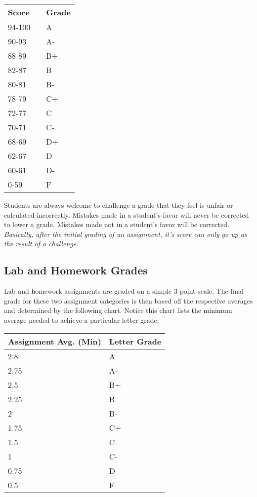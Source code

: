 \documentclass[10pt]{article}
\begin{document}
\begin{center}
\begin{small}
\begin{tabular}{lcl}
Score & & Grade \\ \hline
94-100 & & A \\
90-93 & & A- \\
88-89 & & B+ \\
82-87 & & B \\
80-81 & & B- \\
78-79 & & C+ \\
72-77 & & C \\
70-71 & & C- \\
68-69 & & D+ \\
62-67 & & D \\
60-61 & & D- \\
0-59 & & F 
\end{tabular}
\end{small}
\end{center}

Students are always welcome to challenge a grade that they feel is unfair or calculated incorrectly.  Mistakes made in a student's favor will never be corrected to lower a grade.  Mistakes made not in a student's favor will be corrected.  \textit{Basically, after the initial grading of an assignment, it's score can only go up as the result of a challenge.}

\subsection{Lab and Homework Grades}

Lab and homework assignments are graded on a simple 3 point scale.  The final grade for these two assignment categories is then based off the respective averages and determined by the following chart.  Notice this chart lists the minimum average needed to achieve a particular letter grade.  

\begin{center}
\begin{small}
\begin{tabular}{ll}
Assignment Avg. (Min) & Letter Grade \\ \hline
2.8   & A  \\
2.75    & A- \\
2.5 & B+ \\
2.25    & B  \\ 
2   & B- \\
1.75    & C+ \\
1.5 & C  \\
1   & C- \\
0.75    & D  \\
0.5  & F 
\end{tabular}
\end{small}
\end{center}
\end{document}

